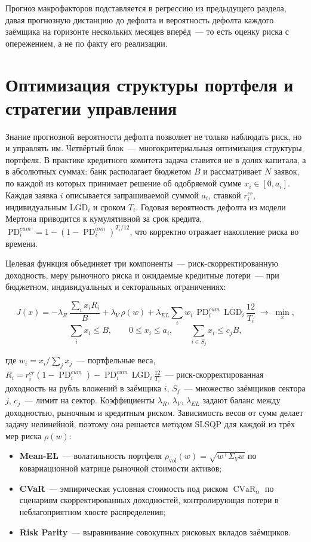 \documentclass[a4paper,12pt]{article}
\DeclareMathOperator{\PD}{PD}
\DeclareMathOperator{\CVaR}{CVaR}
\begin{document}
Прогноз макрофакторов подставляется в регрессию из предыдущего раздела, давая прогнозную
дистанцию до дефолта и вероятность дефолта каждого заёмщика на горизонте нескольких
месяцев вперёд~--- то есть оценку риска с опережением, а не по факту его реализации.

\section{Оптимизация структуры портфеля и стратегии управления}

Знание прогнозной вероятности дефолта позволяет не только наблюдать риск, но и управлять им.
Четвёртый блок~--- многокритериальная оптимизация структуры портфеля. В практике кредитного
комитета задача ставится не в долях капитала, а в абсолютных суммах: банк располагает бюджетом
$B$ и рассматривает $N$ заявок, по каждой из которых принимает решение об одобряемой сумме
$x_i \in [0, a_i]$. Каждая заявка $i$ описывается запрашиваемой суммой $a_i$, ставкой $r_i^{cr}$,
индивидуальным $\mathrm{LGD}_i$ и сроком $T_i$. Годовая вероятность дефолта из модели Мертона
приводится к кумулятивной за срок кредита, $\PD_i^{cum} = 1 - (1 - \PD_i^{ann})^{T_i/12}$,
что корректно отражает накопление риска во времени.

Целевая функция объединяет три компоненты~--- риск-скорректированную доходность, меру рыночного
риска и ожидаемые кредитные потери~--- при бюджетном, индивидуальных и секторальных ограничениях:

\[
    J(x) = -\lambda_R \, \frac{\sum_{i} x_i R_i}{B}
           + \lambda_V \, \rho(w)
           + \lambda_{EL} \sum_{i} w_i \, \PD_i^{cum} \, \mathrm{LGD}_i \, \frac{12}{T_i}
           \;\to\; \min_{x},
\]
\[
    \sum_{i} x_i \le B, \qquad 0 \le x_i \le a_i, \qquad
    \sum_{i \in S_j} x_i \le c_j B,
\]

где $w_i = x_i / \sum_j x_j$~--- портфельные веса, $R_i = r_i^{cr}(1 - \PD_i^{cum})
- \PD_i^{cum}\,\mathrm{LGD}_i\,\tfrac{12}{T_i}$~--- риск-скорректированная доходность на рубль
вложений в заёмщика $i$, $S_j$~--- множество заёмщиков сектора $j$, $c_j$~--- лимит на сектор. Коэффициенты
$\lambda_R$, $\lambda_V$, $\lambda_{EL}$ задают баланс между доходностью, рыночным и кредитным
риском. Зависимость весов от сумм делает задачу нелинейной, поэтому она решается методом SLSQP
для каждой из трёх мер риска $\rho(w)$:

\begin{itemize}[leftmargin=2em, itemsep=2pt]
    \item \textbf{Mean-EL}~--- волатильность портфеля $\rho_{\text{vol}}(w) = \sqrt{w^\top \Sigma_V w}$
        по ковариационной матрице рыночной стоимости активов;
    \item \textbf{CVaR}~--- эмпирическая условная стоимость под риском $\CVaR_\alpha$ по сценариям
        скорректированных доходностей, контролирующая потери в неблагоприятном хвосте распределения;
    \item \textbf{Risk Parity}~--- выравнивание совокупных рисковых вкладов заёмщиков.
\end{itemize}
\end{document}
